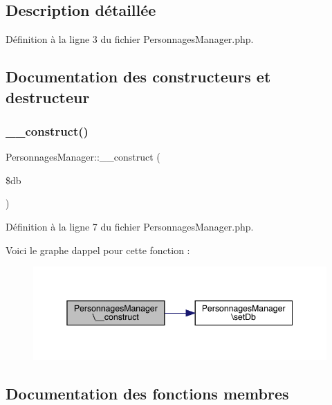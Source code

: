 \subsection{Description détaillée}


Définition à la ligne 3 du fichier Personnages\+Manager.\+php.



\subsection{Documentation des constructeurs et destructeur}
\mbox{\label{class_personnages_manager_a7d278f81159b0faf52c83338147f4e40}} 
\subsubsection{\texorpdfstring{\+\_\+\+\_\+construct()}{\_\_construct()}}
{\footnotesize\ttfamily Personnages\+Manager\+::\+\_\+\+\_\+construct (\begin{DoxyParamCaption}\item[{}]{\$db }\end{DoxyParamCaption})}



Définition à la ligne 7 du fichier Personnages\+Manager.\+php.

Voici le graphe d\textquotesingle{}appel pour cette fonction \+:\nopagebreak
\begin{figure}[H]
\begin{center}
\leavevmode
\includegraphics[width=345pt]{class_personnages_manager_a7d278f81159b0faf52c83338147f4e40_cgraph}
\end{center}
\end{figure}


\subsection{Documentation des fonctions membres}
\mbox{\label{class_personnages_manager_a3ce7c5751a3faedb4f639a009ff0243e}} 
